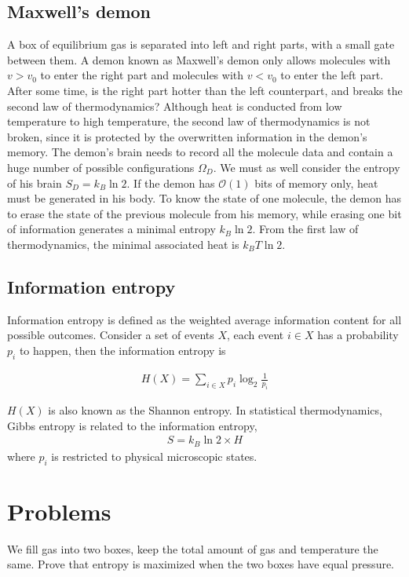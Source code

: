 \documentclass[12pt]{book} %
\numberwithin{equation}{chapter}
\def\W{\Omega}
\def\bigO{\mathcal{O}}
\begin{document}
\subsection*{Maxwell's demon}
A box of equilibrium gas is separated into left and right parts, with a small gate between them. A demon known as Maxwell's demon only allows molecules with $v>v_{0}$ to enter the right part and molecules with $v<v_{0}$ to enter the left part. After some time, is the right part hotter than the left counterpart, and breaks the second law of thermodynamics?\bigskip\newline
Although heat is conducted from low temperature to high temperature, the second law of thermodynamics is not broken, since it is protected by the overwritten information in the demon's memory. The demon's brain needs to record all the molecule data and contain a huge number of possible configurations $\W_{D}$. We must as well consider the entropy of his brain $S_{D}=k_{B}\ln 2$.\bigskip\newline
If the demon has $\bigO(1)$ bits of memory only, heat must be generated in his body. To know the state of one molecule, the demon has to erase the state of the previous molecule from his memory, while erasing one bit of information generates a minimal entropy $k_{B}\ln 2$. From the first law of thermodynamics, the minimal associated heat is $k_{B}T\ln 2$.

\subsection*{Information entropy}
Information entropy is defined as the weighted average information content for all possible outcomes. Consider a set of events $X$, each event $i\in X$ has a probability $p_{i}$ to happen, then the information entropy is
\begin{eqnbox}
\begin{align}
H(X)=\sum_{i\in X}p_{i}\log_{2}\frac{1}{p_{i}}
\end{align}
\end{eqnbox}
$H(X)$ is also known as the Shannon entropy.\bigskip\newline
In statistical thermodynamics, Gibbs entropy is related to the information entropy,
\begin{align*}
S=k_{B}\ln 2\times H
\end{align*}
where $p_{i}$ is restricted to physical microscopic states.

\section*{Problems}
\begin{problem}
We fill gas into two boxes, keep the total amount of gas and temperature the same. Prove that entropy is maximized when the two boxes have equal pressure.
\end{problem}
\end{document}
